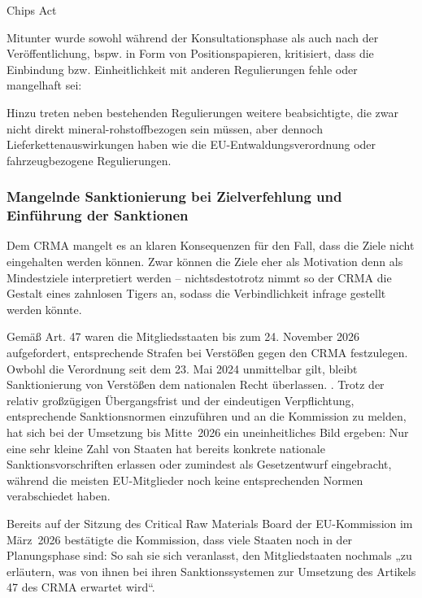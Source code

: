 \documentclass[12pt,a4paper,oneside]{book} %
\begin{document}
Chips Act

Mitunter wurde sowohl während der Konsultationsphase als auch nach der Veröffentlichung, bspw. in Form von Positionspapieren, kritisiert, dass die Einbindung bzw. Einheitlichkeit mit anderen Regulierungen fehle oder mangelhaft sei:

Hinzu treten neben bestehenden Regulierungen weitere beabsichtigte, die zwar nicht direkt mineral-rohstoffbezogen sein müssen, aber dennoch Lieferkettenauswirkungen haben wie die EU-Entwaldungsverordnung oder fahrzeugbezogene Regulierungen.




\subsubsection{Mangelnde Sanktionierung bei Zielverfehlung und Einführung der Sanktionen}

Dem CRMA mangelt es an klaren Konsequenzen für den Fall, dass die Ziele nicht eingehalten werden können. Zwar können die Ziele eher als Motivation denn als Mindestziele interpretiert werden \autocite{finden, existiert} -- nichtsdestotrotz nimmt so der CRMA die Gestalt eines zahnlosen Tigers an, sodass die Verbindlichkeit infrage gestellt werden könnte.

Gemäß Art. 47 waren die Mitgliedsstaaten bis zum 24. November 2026 aufgefordert, entsprechende Strafen bei Verstößen gegen den CRMA festzulegen. Owbohl die Verordnung seit dem 23. Mai 2024 unmittelbar gilt, bleibt Sanktionierung von Verstößen dem nationalen Recht überlassen. . Trotz der relativ großzügigen Übergangsfrist und der eindeutigen Verpflichtung, entsprechende Sanktionsnormen einzuführen und an die Kommission zu melden, hat sich bei der Umsetzung bis Mitte 2026 ein uneinheitliches Bild ergeben: Nur eine sehr kleine Zahl von Staaten hat bereits konkrete nationale Sanktionsvorschriften erlassen oder zumindest als Gesetzentwurf eingebracht, während die meisten EU-Mitglieder noch keine entsprechenden Normen verabschiedet haben.

Bereits auf der Sitzung des Critical Raw Materials Board der EU-Kommission im März 2026 bestätigte die Kommission, dass viele Staaten noch in der Planungsphase sind: So sah sie sich veranlasst, den Mitgliedstaaten nochmals „zu erläutern, was von ihnen bei ihren Sanktionssystemen zur Umsetzung des Artikels 47 des CRMA erwartet wird“.\autocite{https://webgate.ec.europa.eu/circabc-ewpp/d/d/workspace/SpacesStore/16029996-bf1b-48b9-b525-fc6d6f0515eb/download}
\end{document}
